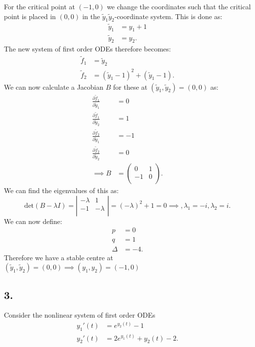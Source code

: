 For the critical point at $(-1,0)$ we change the coordinates such that the critical point is placed in $(0,0)$ in the $\tilde{y}_1\tilde{y}_2$-coordinate system. This is done as:
\begin{align*}
  \tilde{y}_1 &= y_1 + 1 \\
  \tilde{y}_2 &= y_2
.\end{align*}
The new system of first order ODEs therefore becomes:
\begin{align*}
  \tilde{f}_1 &= \tilde{y}_2 \\
  \tilde{f}_2 &= \left( \tilde{y}_1 - 1 \right)^2 + \left( \tilde{y}_1 - 1 \right)
.\end{align*}
We can now calculate a Jacobian $B$ for these at $\left( \tilde{y}_1, \tilde{y}_2 \right) = \left( 0,0 \right) $ as:
\begin{align*}
  \frac{\partial \tilde{f}_1}{\partial \tilde{y}_1} &= 0 \\
  \frac{\partial \tilde{f}_1}{\partial \tilde{y}_2} &= 1 \\
  \frac{\partial \tilde{f}_2}{\partial \tilde{y}_1} &= -1 \\
  \frac{\partial \tilde{f}_2}{\partial \tilde{y}_2} &= 0 \\
  \implies B &= \begin{pmatrix}
  0 & 1\\
  -1 & 0\\
  \end{pmatrix}
.\end{align*}
We can find the eigenvalues of this as:
\[ 
\mathrm{det}(B - \lambda I) = \left| \begin{array}{cc}
-\lambda & 1\\
-1 & -\lambda\\
\end{array} \right| = \left( -\lambda \right)^2 + 1 = 0 \implies, \lambda_1 = -i, \lambda_2 = i
.\]
We can now define:
\begin{align*}
  p &= 0 \\
  q &= 1 \\
  \Delta &= -4
.\end{align*}
Therefore we have a stable centre at $\left( \tilde{y}_1, \tilde{y}_2 \right) = (0,0) \implies \left( y_1, y_2 \right) = \left( -1, 0 \right) $

\subsection*{3.} Consider the nonlinear system of first order ODEs
\begin{align*}
  y_1'(t) &= e^{y_2(t)} -1 \\
  y_2'(t) &= 2 e^{y_1(t)} + y_2(t) - 2
.\end{align*}

